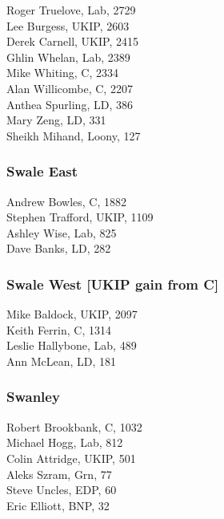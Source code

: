 \documentclass[a4paper,openany,10pt]{book}
\begin{document}


Roger Truelove, Lab, 2729\\
Lee Burgess, UKIP, 2603\\
Derek Carnell, UKIP, 2415\\
Ghlin Whelan, Lab, 2389\\
Mike Whiting, C, 2334\\
Alan Willicombe, C, 2207\\
Anthea Spurling, LD, 386\\
Mary Zeng, LD, 331\\
Sheikh Mihand, Loony, 127\\


\subsubsection*{Swale East}



Andrew Bowles, C, 1882\\
Stephen Trafford, UKIP, 1109\\
Ashley Wise, Lab, 825\\
Dave Banks, LD, 282\\


\subsubsection*{Swale West \hspace*{\fill}\nolinebreak[1]%
\enspace\hspace*{\fill}
[UKIP gain from C]}



Mike Baldock, UKIP, 2097\\
Keith Ferrin, C, 1314\\
Leslie Hallybone, Lab, 489\\
Ann McLean, LD, 181\\


\subsubsection*{Swanley}



Robert Brookbank, C, 1032\\
Michael Hogg, Lab, 812\\
Colin Attridge, UKIP, 501\\
Aleks Szram, Grn, 77\\
Steve Uncles, EDP, 60\\
Eric Elliott, BNP, 32\\
\end{document}
